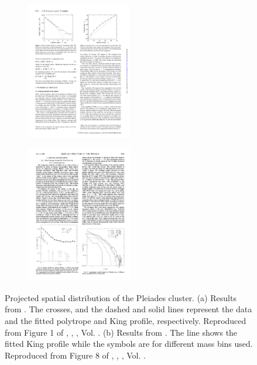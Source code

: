 \begin{figure}[ht!]
    \centering
    \begin{subfigure}[t]{0.49\textwidth} \centering
        \includegraphics[height=6cm]{background/Figures/F1_Converse2010.pdf}
        \caption{}
        \label{fig:spatialConverse}
    \end{subfigure}
    \begin{subfigure}[t]{0.49\textwidth} \centering
       \includegraphics[height=6cm]{background/Figures/F8_Adams2001.pdf}
        \caption{}
        \label{fig:spatialAdams} 
    \end{subfigure}
    \caption{Projected spatial distribution of the Pleiades cluster. (a) Results from  \citet{Converse2010}. The crosses, and the dashed and solid lines represent the data and the fitted polytrope and King profile, respectively. Reproduced from Figure 1 of \citet{Converse2010}, \textit{}, , Vol. . (b) Results from \citet{Adams2001}. The line shows the fitted King profile while the symbols are for different mass bins used. Reproduced from Figure 8 of \citet{Adams2001}, \textit{}, , Vol. .}
\end{figure}

